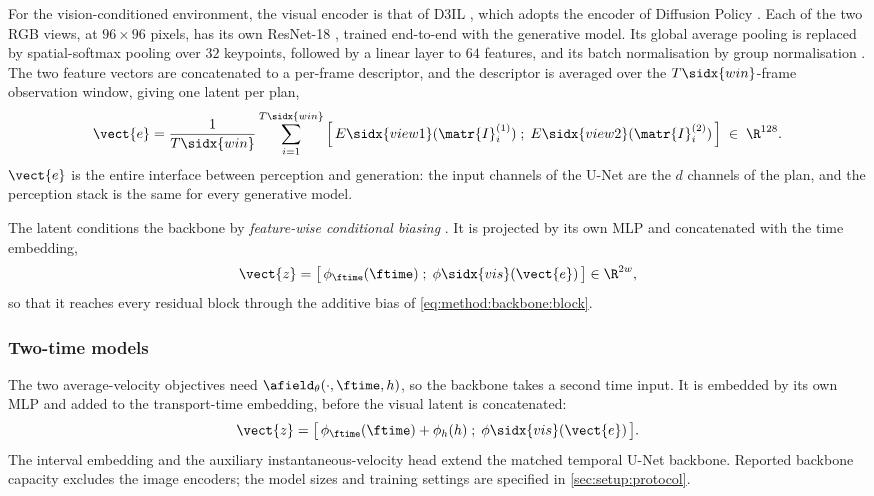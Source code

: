 For the vision-conditioned environment, the visual encoder is that of D3IL \parencite{jia2024towards},
which adopts the encoder of Diffusion Policy \parencite[Sec.~3.2]{chi2023diffusion}. Each of the two
RGB views, at $96\times96$ pixels, has its own ResNet-18 \parencite{he2016deep}, trained end-to-end
with the generative model. Its global average pooling is replaced by spatial-softmax pooling
\parencite{mandlekar2021matters} over $32$ keypoints, followed by a linear layer to $64$ features, and
its batch normalisation by group normalisation \parencite{wu2018group}. The two feature vectors are
concatenated to a per-frame descriptor, and the descriptor is averaged over the
$T\sidx{win}$-frame observation window, giving one latent per plan,
\begin{equation}\label{eq:method:backbone:latent}
  \vect{e}
  = \frac{1}{T\sidx{win}}\sum_{i=1}^{T\sidx{win}}
    \Big[\,E\sidx{view1}(\matr{I}^{(1)}_{i})\;;\;E\sidx{view2}(\matr{I}^{(2)}_{i})\,\Big]
  \;\in\;\R^{128}.
\end{equation}
$\vect{e}$ is the entire interface between perception and generation: the input channels of the
U-Net are the $d$ channels of the plan, and the perception stack is the same for every generative
model.

The latent conditions the backbone by \emph{feature-wise conditional biasing}
\parencite[Sec.~3]{perez2017film}. It is projected by its own MLP and concatenated with the time
embedding,
\begin{equation}\label{eq:method:backbone:concat}
  \vect{z} = \big[\,\phi_{\ftime}(\ftime)\;;\;\phi\sidx{vis}(\vect{e})\,\big] \in \R^{2w},
\end{equation}
so that it reaches every residual block through the additive bias of
\eqref{eq:method:backbone:block}.

\subsubsection*{Two-time models}

The two average-velocity objectives need $\afield_{\theta}(\cdot,\ftime,h)$, so the backbone takes a
second time input. It is embedded by its own MLP and added to the transport-time embedding, before
the visual latent is concatenated:
\begin{equation}\label{eq:method:backbone:twotime}
  \vect{z} = \big[\,\phi_{\ftime}(\ftime) + \phi_{h}(h)\;;\;\phi\sidx{vis}(\vect{e})\,\big].
\end{equation}
The interval embedding and the auxiliary instantaneous-velocity head extend the matched temporal
U-Net backbone. Reported backbone capacity excludes the image encoders; the model sizes and training
settings are specified in \autoref{sec:setup:protocol}.

